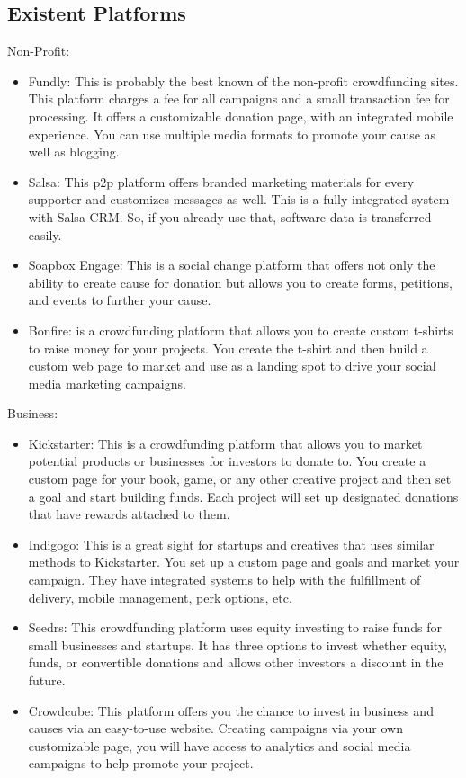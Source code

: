 \subsection*{ Existent Platforms }
Non-Profit:
\begin{itemize}
      \item
            Fundly: This is probably the best known of the non-profit crowdfunding sites. This platform charges a fee for all campaigns and a small transaction fee for processing. It offers a customizable donation page, with an integrated mobile experience. You can use multiple media formats to promote your cause as well as blogging.
      \item
            Salsa: This p2p platform offers branded marketing materials for every supporter and customizes messages as well. This is a fully integrated system with Salsa CRM. So, if you already use that, software data is transferred easily.
      \item
            Soapbox Engage: This is a social change platform that offers not only the ability to create cause for donation but allows you to create forms, petitions, and events to further your cause.
      \item
            Bonfire: is a crowdfunding platform that allows you to create custom t-shirts to raise money for your projects. You create the t-shirt and then build a custom web page to market and use as a landing spot to drive your social media marketing campaigns.
\end{itemize}
Business:
\begin{itemize}
      \item
            Kickstarter: This is a crowdfunding platform that allows you to market potential products or businesses for investors to donate to. You create a custom page for your book, game, or any other creative project and then set a goal and start building funds. Each project will set up designated donations that have rewards attached to them.
      \item
            Indigogo: This is a great sight for startups and creatives that uses similar methods to Kickstarter. You set up a custom page and goals and market your campaign. They have integrated systems to help with the fulfillment of delivery, mobile management, perk options, etc.
      \item
            Seedrs: This crowdfunding platform uses equity investing to raise funds for small businesses and startups. It has three options to invest whether equity, funds, or convertible donations and allows other investors a discount in the future.
      \item
            Crowdcube: This platform offers you the chance to invest in business and causes via an easy-to-use website. Creating campaigns via your own customizable page, you will have access to analytics and social media campaigns to help promote your project.
\end{itemize}




